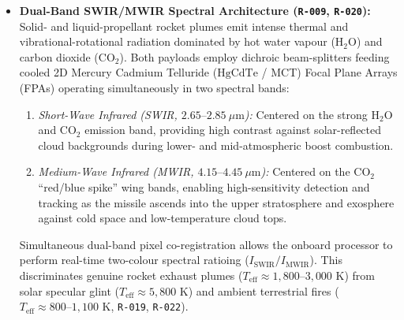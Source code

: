 \documentclass[11pt,a4paper]{article}
\providecommand{\abbr}[1]{#1}
\begin{document}
\begin{itemize}
    \item \textbf{Dual-Band \abbr{SWIR}/\abbr{MWIR} Spectral Architecture (\texttt{R-009}, \texttt{R-020}):} Solid- and liquid-propellant rocket plumes emit intense thermal and vibrational-rotational radiation dominated by hot water vapour ($\mathrm{H_2O}$) and carbon dioxide ($\mathrm{CO_2}$). Both payloads employ dichroic beam-splitters feeding cooled 2D Mercury Cadmium Telluride ($\mathrm{HgCdTe}$ / \abbr{MCT}) Focal Plane Arrays (\abbr{FPA}s) operating simultaneously in two spectral bands:
    \begin{enumerate}
        \item \emph{Short-Wave Infrared (\abbr{SWIR}, $2.65\text{--}2.85~\mu\mathrm{m}$):} Centered on the strong $\mathrm{H_2O}$ and $\mathrm{CO_2}$ emission band, providing high contrast against solar-reflected cloud backgrounds during lower- and mid-atmospheric boost combustion.
        \item \emph{Medium-Wave Infrared (\abbr{MWIR}, $4.15\text{--}4.45~\mu\mathrm{m}$):} Centered on the $\mathrm{CO_2}$ ``red/blue spike'' wing bands, enabling high-sensitivity detection and tracking as the missile ascends into the upper stratosphere and exosphere against cold space and low-temperature cloud tops.
    \end{enumerate}
    Simultaneous dual-band pixel co-registration allows the onboard processor to perform real-time two-colour spectral ratioing ($I_{\text{SWIR}}/I_{\text{MWIR}}$). This discriminates genuine rocket exhaust plumes ($T_{\text{eff}} \approx 1{,}800\text{--}3{,}000\text{ K}$) from solar specular glint ($T_{\text{eff}} \approx 5{,}800\text{ K}$) and ambient terrestrial fires ($T_{\text{eff}} \approx 800\text{--}1{,}100\text{ K}$, \texttt{R-019}, \texttt{R-022}).
\end{itemize}
\end{document}
